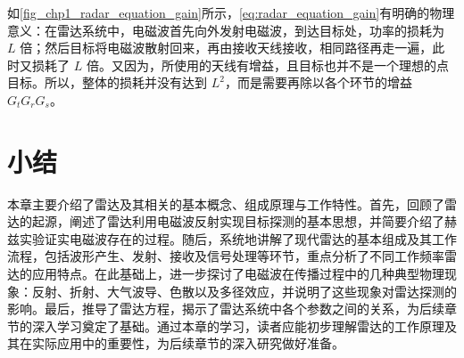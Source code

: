 如\cref{fig_chp1_radar_equation_gain}所示，\cref{eq:radar_equation_gain}有明确的物理意义：在雷达系统中，电磁波首先向外发射电磁波，到达目标处，功率的损耗为 $L$ 倍；然后目标将电磁波散射回来，再由接收天线接收，相同路径再走一遍，此时又损耗了 $L$ 倍。又因为，所使用的天线有增益，且目标也并不是一个理想的点目标。所以，整体的损耗并没有达到 $L^2$，而是需要再除以各个环节的增益 $G_t G_r G_s$。

\section{小结}

本章主要介绍了雷达及其相关的基本概念、组成原理与工作特性。首先，回顾了雷达的起源，阐述了雷达利用电磁波反射实现目标探测的基本思想，并简要介绍了赫兹实验证实电磁波存在的过程。随后，系统地讲解了现代雷达的基本组成及其工作流程，包括波形产生、发射、接收及信号处理等环节，重点分析了不同工作频率雷达的应用特点。在此基础上，进一步探讨了电磁波在传播过程中的几种典型物理现象：反射、折射、大气波导、色散以及多径效应，并说明了这些现象对雷达探测的影响。最后，推导了雷达方程，揭示了雷达系统中各个参数之间的关系，为后续章节的深入学习奠定了基础。通过本章的学习，读者应能初步理解雷达的工作原理及其在实际应用中的重要性，为后续章节的深入研究做好准备。